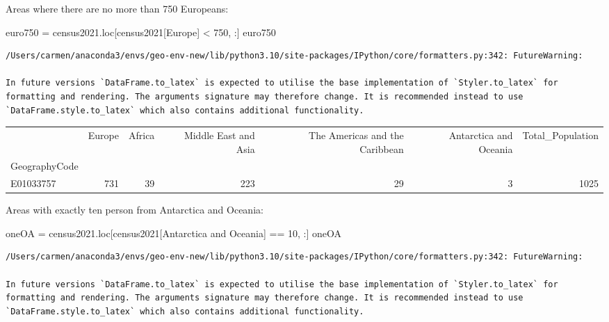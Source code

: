 \documentclass[
  letterpaper,
  DIV=11,
  numbers=noendperiod]{scrreprt}
\newenvironment{Shaded}{\begin{snugshade}}{\end{snugshade}}
\newcommand{\DecValTok}[1]{\textcolor[rgb]{0.68,0.00,0.00}{#1}}
\newcommand{\NormalTok}[1]{\textcolor[rgb]{0.00,0.23,0.31}{#1}}
\newcommand{\OperatorTok}[1]{\textcolor[rgb]{0.37,0.37,0.37}{#1}}
\newcommand{\StringTok}[1]{\textcolor[rgb]{0.13,0.47,0.30}{#1}}
\begin{document}
Areas where there are no more than 750 Europeans:

\begin{Shaded}
\begin{Highlighting}[]
\NormalTok{euro750 }\OperatorTok{=}\NormalTok{ census2021.loc[census2021[}\StringTok{\textquotesingle{}Europe\textquotesingle{}}\NormalTok{] }\OperatorTok{\textless{}} \DecValTok{750}\NormalTok{, :]}
\NormalTok{euro750}
\end{Highlighting}
\end{Shaded}

\begin{verbatim}
/Users/carmen/anaconda3/envs/geo-env-new/lib/python3.10/site-packages/IPython/core/formatters.py:342: FutureWarning:

In future versions `DataFrame.to_latex` is expected to utilise the base implementation of `Styler.to_latex` for formatting and rendering. The arguments signature may therefore change. It is recommended instead to use `DataFrame.style.to_latex` which also contains additional functionality.
\end{verbatim}

\begin{tabular}{lrrrrrr}
\toprule
{} &  Europe &  Africa &  Middle East and Asia &  The Americas and the Caribbean &  Antarctica and Oceania &  Total\_Population \\
GeographyCode &         &         &                       &                                 &                         &                   \\
\midrule
E01033757     &     731 &      39 &                   223 &                              29 &                       3 &              1025 \\
\bottomrule
\end{tabular}

Areas with exactly ten person from Antarctica and Oceania:

\begin{Shaded}
\begin{Highlighting}[]
\NormalTok{oneOA }\OperatorTok{=}\NormalTok{ census2021.loc[census2021[}\StringTok{\textquotesingle{}Antarctica and Oceania\textquotesingle{}}\NormalTok{] }\OperatorTok{==} \DecValTok{10}\NormalTok{, :]}
\NormalTok{oneOA}
\end{Highlighting}
\end{Shaded}

\begin{verbatim}
/Users/carmen/anaconda3/envs/geo-env-new/lib/python3.10/site-packages/IPython/core/formatters.py:342: FutureWarning:

In future versions `DataFrame.to_latex` is expected to utilise the base implementation of `Styler.to_latex` for formatting and rendering. The arguments signature may therefore change. It is recommended instead to use `DataFrame.style.to_latex` which also contains additional functionality.
\end{verbatim}
\end{document}

